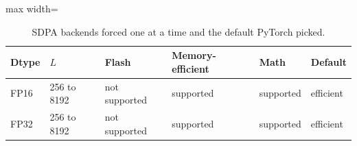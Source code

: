 \begin{table}[!htb]
\centering
\scriptsize
\setlength{\tabcolsep}{3.5pt}
\caption{SDPA backends forced one at a time and the default PyTorch picked.}
\label{tab:t2abackends}
\begin{adjustbox}{max width=\linewidth}
\begin{tabular}{llllll}
\toprule
Dtype & $L$ & Flash & Memory-efficient & Math & Default \\
\midrule
FP16 & 256 to 8192 & not supported & supported & supported & efficient \\
FP32 & 256 to 8192 & not supported & supported & supported & efficient \\
\bottomrule
\end{tabular}
\end{adjustbox}
\end{table}

